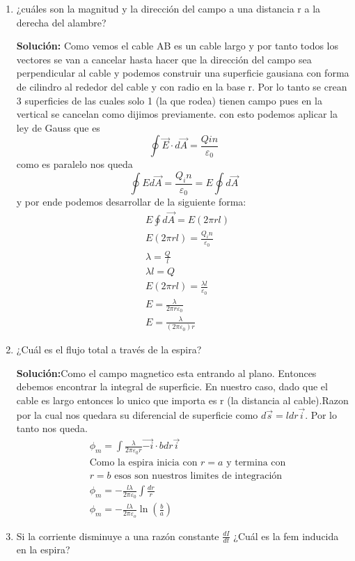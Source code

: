 \documentclass[12pt]{exam}
\begin{document}
\begin{enumerate}
    \item ¿cuáles son la magnitud y la dirección del campo a una distancia r a la derecha del alambre?
    
    \textbf{Solución:} Como vemos el cable AB es un cable largo y por tanto todos los vectores se van a cancelar hasta hacer que
    la dirección del campo sea perpendicular al cable y podemos construir una superficie gausiana con forma de cilindro
    al rededor del cable y con radio en la base r. Por lo tanto se crean 3 superficies de las cuales solo 1 (la que rodea) tienen
    campo pues en la vertical se cancelan como dijimos previamente. con esto podemos aplicar la ley de Gauss que es 
    $$\oint \vec{E}\cdot d\vec{A}=\frac{Qin}{\varepsilon_0}$$
    como es paralelo nos queda $$\oint Ed\vec{A}=\frac{Q_in}{\varepsilon_0}=E\oint d\vec{A}$$
    y por ende podemos desarrollar de la siguiente forma:
    \begin{align*}
        &E\oint d\vec{A} = E(2\pi r l)\\
        & E(2\pi r l) = \frac{Q_in}{\varepsilon_0}\\
        &\lambda = \frac{Q}{l}\\
        &\lambda l = Q\\
        &E(2\pi r l) = \frac{\lambda l}{\varepsilon_0}\\
        &E = \frac{\lambda}{2 \pi r \varepsilon_0}\\
        &E = \frac{\lambda}{(2\pi\varepsilon_0)r}
    \end{align*}
    \item ¿Cuál es el flujo total a través de la espira?
    
    \textbf{Solución:}Como el campo magnetico esta entrando al plano. Entonces debemos encontrar la integral de superficie. En nuestro caso,
    dado que el cable es largo entonces lo unico que importa es r (la distancia al cable).Razon por la cual nos quedara su
    diferencial de superficie como $d\vec{s} = l dr \vec{i}$. Por lo tanto nos queda. 
    \begin{align*}
        &\phi_m = \int \frac{\lambda}{2\pi\varepsilon_0 r}\vec{-i}\cdot bdr\vec{i}\\
        &\text{Como la espira inicia con $r=a$ y termina con} \\
        &\text{$r=b$ esos son nuestros limites de integración}\\
        &\phi_m = -\frac{l\lambda}{2\pi\varepsilon_0}\int \frac{dr}{r}\\
        &\phi_m = -\frac{l\lambda}{2\pi\varepsilon_o}\ln{\left(\frac{b}{a}\right)}
    \end{align*}
    \item Si la corriente disminuye a una razón constante $\frac{dI}{dt}$ ¿Cuál es la fem inducida en la espira?
    

\end{enumerate}
\end{document}
